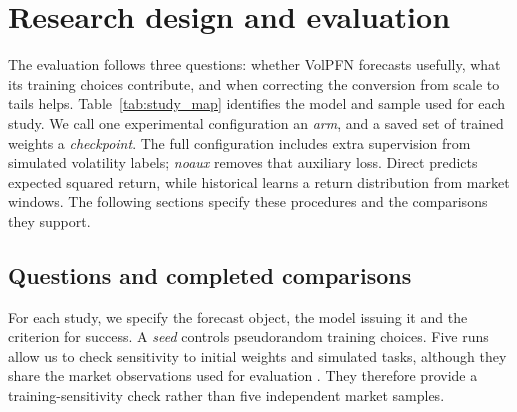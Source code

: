 \chapter{Research design and evaluation}
\label{ch:data}

The evaluation follows three questions: whether VolPFN forecasts usefully, what its training choices contribute, and when correcting the conversion from scale to tails helps. Table~\ref{tab:study_map} identifies the model and sample used for each study. We call one experimental configuration an \emph{arm}, and a saved set of trained weights a \emph{checkpoint}. The full configuration includes extra supervision from simulated volatility labels; \emph{noaux} removes that auxiliary loss. Direct predicts expected squared return, while historical learns a return distribution from market windows. The following sections specify these procedures and the comparisons they support.

\section{Questions and completed comparisons}

For each study, we specify the forecast object, the model issuing it and the criterion for success. A \emph{seed} controls pseudorandom training choices. Five runs allow us to check sensitivity to initial weights and simulated tasks, although they share the market observations used for evaluation \citep{bouthillier2021variance}. They therefore provide a training-sensitivity check rather than five independent market samples.

